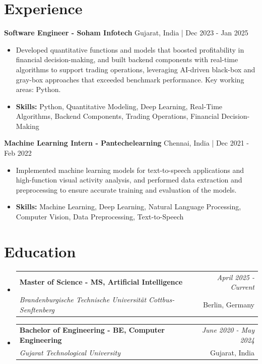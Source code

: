 \documentclass[a4paper,11pt]{article}
\makeatletter
\newcommand{\resumeSubheading}[4]{
\vspace{0.5mm}\item
    \begin{tabular*}{\linewidth}[t]{l@{\extracolsep{\fill}}r}
        \textbf{#1} & \textit{\footnotesize{#4}} \\
        \textit{\footnotesize{#3}} &  \footnotesize{#2}\\
    \end{tabular*}
    \vspace{-2.4mm}
}
\makeatother
\begin{document}
\section{\textbf{Experience}}


\vspace{1mm}
  \textbf{Software Engineer - Soham Infotech} \hfill Gujarat, India | Dec 2023 - Jan 2025
\vspace{-1.5mm} %
\begin{itemize}
  \item Developed quantitative functions and models that boosted profitability in financial decision-making, and built backend components with real-time algorithms to support trading operations, leveraging AI-driven black-box and gray-box approaches that exceeded benchmark performance. Key working areas: Python.

\vspace{-2mm}
  \item \textbf{Skills:} Python, Quantitative Modeling, Deep Learning, Real-Time Algorithms, Backend Components, Trading Operations, Financial Decision-Making
\end{itemize}

\vspace{1mm}
  \textbf{Machine Learning Intern - Pantechelearning} \hfill Chennai, India | Dec 2021 - Feb 2022
\vspace{-1.5mm} %
\begin{itemize}
  \item Implemented machine learning models for text-to-speech applications and high-function visual activity analysis, and performed data extraction and preprocessing to ensure accurate training and evaluation of the models.
\vspace{-2mm}
  \item \textbf{Skills:} Machine Learning, Deep Learning, Natural Language Processing, Computer Vision, Data Preprocessing, Text-to-Speech
\end{itemize}\section{\textbf{Education}}
\vspace{-0.4mm}

\begin{itemize}[leftmargin=0.15in, label={}]
\resumeSubheading
{Master of Science - MS, Artificial Intelligence }{Berlin, Germany}
{Brandenburgische Technische Universität Cottbus-Senftenberg  }{April 2025 - Current}

\vspace{1.0mm} %
\resumeSubheading
{Bachelor of Engineering - BE, Computer Engineering  }{Gujarat, India}
{Gujarat Technological University }{June 2020 - May 2024}

\end{itemize}
\end{document}
